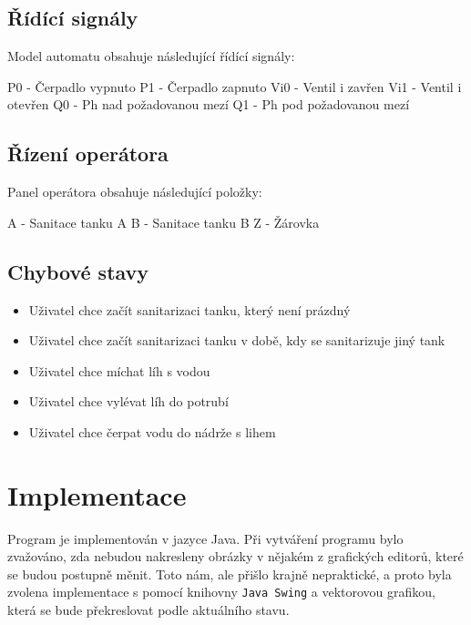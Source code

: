 \documentclass[12pt, a4paper]{article}
\begin{document}
\subsection{Řídící signály}
Model automatu obsahuje následující řídící signály:

P0 - Čerpadlo vypnuto \newline 
P1 - Čerpadlo zapnuto \newline 
Vi0 - Ventil i zavřen \newline 
Vi1 - Ventil i otevřen \newline 
Q0 - Ph nad požadovanou mezí \newline 
Q1 - Ph pod požadovanou mezí 

\newpage
\subsection{Řízení operátora}
Panel operátora obsahuje následující položky:

A - Sanitace tanku A \newline 
B - Sanitace tanku B \newline 
Z - Žárovka

\subsection{Chybové stavy} \label{chyba}
\begin{itemize}
  \item Uživatel chce začít sanitarizaci tanku, který není prázdný
  \item Uživatel chce začít sanitarizaci tanku v době, kdy se sanitarizuje jiný tank
  \item Uživatel chce míchat líh s vodou
  \item Uživatel chce vylévat líh do potrubí
  \item Uživatel chce čerpat vodu do nádrže s lihem
\end{itemize}

\section{Implementace}
Program je implementován v jazyce Java. Při vytváření programu bylo zvažováno, zda nebudou nakresleny obrázky v nějakém z grafických editorů, které se budou postupně měnit. Toto nám, ale přišlo krajně nepraktické, a proto byla zvolena implementace s pomocí knihovny \texttt{Java Swing} a vektorovou grafikou, která se bude překreslovat podle aktuálního stavu. 
\end{document}

